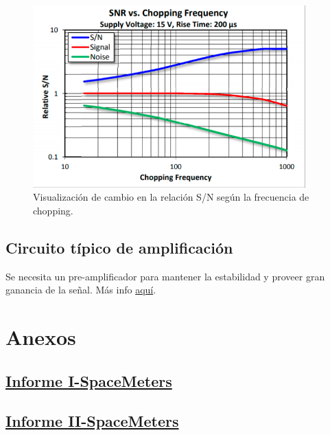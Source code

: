 \documentclass[titlepage,11pt]{article}
\begin{document}
\begin{figure}[htb!]
    \centering
    \includegraphics[height=7cm]{fig/snrchopfreq.png}
    \caption{Visualización de cambio en la relación S/N según la frecuencia de chopping.}
    \label{fig:snrChopFreq}
\end{figure}

\subsection{Circuito típico de amplificación}
Se necesita un pre-amplificador para mantener la estabilidad y proveer gran ganancia de la señal. Más info \href{https://www.thorlabs.com/drawings/53832b2035a4b665-C7A783DC-C708-1572-7544F10825D99274/FDPS3X3-Manual.pdf}{aquí}.


\clearpage
\section{Anexos}

\listoffigures
{}

\subsection{\href{https://drive.google.com/open?id=1XFQf_anSSaL9RTy9PBaxXfIFHyrzE6CN}{Informe I-SpaceMeters}}
\subsection{\href{https://drive.google.com/open?id=1-w1e1fudWwtTKKnJxD-XJ_QvBDY1P5ty}{Informe II-SpaceMeters}}


\end{document}
